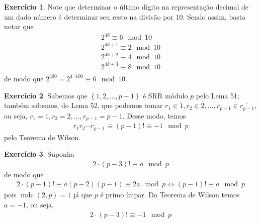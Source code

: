 \documentclass[a4paper,12pt]{article}
\DeclareMathOperator{\mdc}{mdc}
\theoremstyle{definition}
\newtheorem{exercise}{Exercício}%
\begin{document}
	\begin{exercise}
		Note que determinar o último dígito na representação decimal de um dado número é determinar seu resto na divisão por $10$. Sendo assim, basta notar que
		\begin{align*}
		2^{4k} \equiv 6\mod 10 \\
		2^{4k+1} \equiv 2\mod 10 \\
		2^{4k+2} \equiv 4\mod 10 \\
		2^{4k+3} \equiv 8\mod 10 \\
		\end{align*}
		de modo que $2^{400} = 2^{4\cdot 100} \equiv 6\mod 10$.
	\end{exercise}
	\begin{exercise}
		Sabemos que $\left\{ 1, 2, \dots, p-1 \right\}$ é SRR módulo $p$ pelo Lema 51; também sabemos, do Lema 52, que podemos tomar $r_1\in\overline{1}, r_2\in\overline{2}, \dots, r_{p-1}\in\overline{r_{p-1}}$, ou seja, $r_1 = 1, r_2 = 2, \dots, r_{p-1} = p-1$. Desse modo, temos
		\begin{align*}
		r_1r_2\cdots r_{p-1}\equiv (p-1)! \equiv -1\mod p
		\end{align*}
		pelo Teorema de Wilson.
	\end{exercise}
	\begin{exercise}
		Suponha 
		\begin{align*}
		2\cdot (p-3)!\equiv a\mod p
		\end{align*}
		de modo que
		\begin{align*}
		2\cdot (p-1)! \equiv a(p-2)(p-1) \equiv 2a\mod p \Leftrightarrow (p-1)!\equiv a\mod p
		\end{align*}
		pois $\mdc(2,p) = 1$ já que $p$ é primo ímpar. Do Teorema de Wilson temos $a = -1$, ou seja,
		\begin{align*}
		2\cdot (p-3)!\equiv -1\mod p
		\end{align*}
	\end{exercise}
\end{document}
